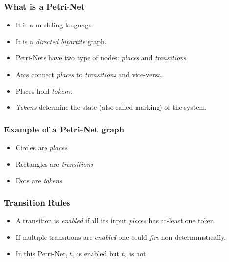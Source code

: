 \begin{frame}
    \frametitle{What is a Petri-Net}
    \begin{itemize}
        \item It is a modeling language.
        \item It is a \emph{directed} \emph{bipartite} graph.
        \item Petri-Nets have two type of nodes: \emph{places} and \emph{transitions}.
        \item Arcs connect \emph{places} to \emph{transitions} and vice-versa.
        \item Places hold \emph{tokens}.
        \item \emph{Tokens} determine the state (also called marking) of the system.
    \end{itemize}
\end{frame}

\begin{frame}
    \frametitle{Example of a Petri-Net graph}
    \begin{itemize}
        \item{Circles are \emph{places}}
        \item{Rectangles are \emph{transitions}}
        \item{Dots are \emph{tokens}}
    \end{itemize}
    \begin{figure}
        \centering
        \intropetrinet{}
    \end{figure}
\end{frame}

\begin{frame}
    \frametitle{Transition Rules}
    \begin{itemize}
        \item{A transition is \emph{enabled} if all its input \emph{places} has at-least one token.}
        \item{If multiple transitions are \emph{enabled} one could \emph{fire} non-deterministically.}
        \item{In this Petri-Net, $t_1$ is enabled but $t_2$ is not}
    \end{itemize}
    \begin{figure}
        \centering
        \intropetrinet[red][blue]{}
    \end{figure}
\end{frame}

